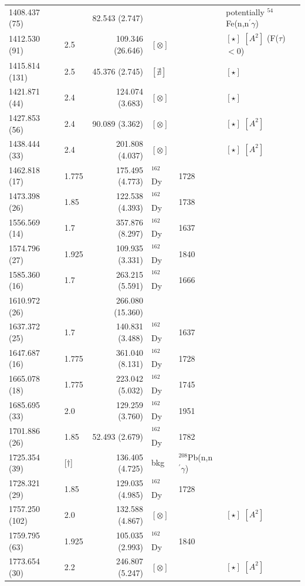 \begin{landscape}
\begin{center}
\begin{longtable}{p{2.6cm}|p{1.2cm}|r|p{1.1cm}|p{2.0cm}|l}
  1408.437 (75)  &            & 82.543  (2.747)& & & potentially $^{54}$Fe(n,n$^\prime\gamma$) \\
  1412.530 (91)  & 2.5        &109.346 (26.646)& $[\otimes]$ & & $[\star]$ $[A^2]$ (F($\tau$)$<$0) \\
  1415.814 (131) & 2.5        & 45.376  (2.745)& $[\nexists]$ & & $[\star]$\\
  1421.871 (44)  & 2.4        &124.074  (3.683)& $[\otimes]$ & & $[\star]$\\
  1427.853 (56)  & 2.4        & 90.089  (3.362)& $[\otimes]$ & & $[\star]$ $[A^2]$\\
  1438.444 (33)  & 2.4        &201.808  (4.037)& $[\otimes]$ & & $[\star]$ $[A^2]$ \\
  1462.818 (17)  & 1.775      &175.495  (4.773)& $^{162}$Dy & 1728 & \\
  1473.398 (26)  & 1.85       &122.538  (4.393)& $^{162}$Dy & 1738 & \\
  1556.569 (14)  & 1.7        &357.876  (8.297)& $^{162}$Dy & 1637 & \\
  1574.796 (27)  & 1.925      &109.935  (3.331)& $^{162}$Dy & 1840 & \\
  1585.360 (16)  & 1.7        &263.215  (5.591)& $^{162}$Dy & 1666 & \\
  1610.972 (26)  &            &266.080 (15.360)& & &  \\
  1637.372 (25)  & 1.7        &140.831  (3.488)& $^{162}$Dy & 1637 & \\
  1647.687 (16)  & 1.775      &361.040  (8.131)& $^{162}$Dy & 1728 & \\
  1665.078 (18)  & 1.775      &223.042  (5.032)& $^{162}$Dy & 1745 & \\
  1685.695 (33)  & 2.0        &129.259  (3.760)& $^{162}$Dy & 1951 & \\
  1701.886 (26)  & 1.85       & 52.493  (2.679)& $^{162}$Dy & 1782 & \\
  1725.354 (39)  & [$\dagger$]  &136.405  (4.725)& bkg & $^{208}$Pb(n,n$^\prime\gamma$) & \\
  1728.321 (29)  & 1.85       &129.035  (4.985)& $^{162}$Dy & 1728 & \\
  1757.250 (102) & 2.0        &132.588  (4.867)& $[\otimes]$ & & $[\star]$ $[A^2]$\\
  1759.795 (63)  & 1.925      &105.035  (2.993)& $^{162}$Dy & 1840 & \\ %
  1773.654 (30)  & 2.2        &246.807  (5.247)& $[\otimes]$ & & $[\star]$ $[A^2]$\\

\end{longtable}
\end{center}
\end{landscape}
